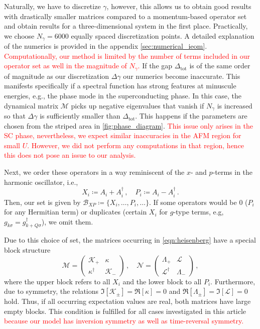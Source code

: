 \documentclass[
    reprint, 
    aps,
    preprintnumbers,
    twocolumn,
    prb,
    superscriptaddress
]{revtex4-2}
\newcommand{\mM}{\mathcal{M}}
\newcommand{\mN}{\mathcal{N}}
\newcommand{\markEdited}{red}
\begin{document}
Naturally, we have to discretize $\gamma$, 
however, this allows us to obtain good results with drastically smaller matrices compared to a momentum-based operator set and obtain results for a three-dimensional system in the first place.
Practically, we choose $N_\gamma = 6000$ equally spaced discretization points.
A detailed explanation of the numerics is provided in the appendix \ref{sec:numerical_ieom}.
\textcolor{\markEdited}{Computationally, our method is limited by the number of terms included in our operator set as well in the magnitude of $N_\gamma$.}
If the gap $\Delta_\text{tot}$ is of the same order of magnitude as our discretization $\Delta \gamma$ our numerics become inaccurate.
This manifests specifically if a spectral function has strong features at minuscule energies, e.g., the phase mode in the superconducting phase.
In this case, the dynamical matrix $\mM$ picks up negative eigenvalues that vanish if $N_\gamma$ is increased so that $\Delta \gamma$ is sufficiently smaller than $\Delta_\text{tot}$.
This happens if the parameters are chosen from the striped area in \autoref{fig:phase_diagram}.
\textcolor{\markEdited}{This issue only arises in the SC phase, nevertheless, we expect similar inaccuracies in the AFM region for small $U$.
However, we did not perform any computations in that region, hence this does not pose an issue to our analysis.}

Next, we order these operators in a way reminiscent of the $x$- and $p$-terms in the harmonic oscillator, i.e.,
\begin{equation}
    X_i \coloneqq  A_i + A_i^\dagger\,,\quad P_i \coloneqq  A_i - A_i^\dagger\,.
\end{equation}
Then, our set is given by $\mathcal{B}_{XP} \coloneqq \{ X_i, \ldots, P_i, \ldots \}$.
If some operators would be 0 ($P_i$ for any Hermitian term) or duplicates (certain $X_i$ for $g$-type terms, e.g, $g_{k\sigma} = g_{k+Q\sigma}^\dagger$), we omit them.

Due to this choice of set, the matrices occurring in \eqref{eqn:heisenberg} have a special block structure
\begin{equation}
    \label{eqn:xp_set}
    \mM = \begin{pmatrix}
        \mathcal{K}_+ & \kappa \\ \kappa^\dagger & \mathcal{K}_-
    \end{pmatrix}\,,\quad \mN = \begin{pmatrix}
        \Lambda_+ & \mathcal{L} \\ \mathcal{L}^\dagger & \Lambda_-
    \end{pmatrix}\,,
\end{equation}
where the upper block refers to all $X_i$ and the lower block to all $P_i$.
Furthermore, due to symmetry, the relations $\Im [\mathcal{K}_\pm] = \Re [\kappa] = 0$ and $\Re [\Lambda_\pm] = \Im [\mathcal{L}] = 0$ hold.
Thus, if all occurring expectation values are real, both matrices have large empty blocks.
This condition is fulfilled for all cases investigated in this article \textcolor{\markEdited}{because our model has inversion symmetry as well as time-reversal symmetry.}
\end{document}
